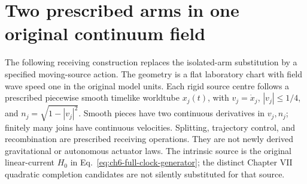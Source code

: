 \section{Two prescribed arms in one original continuum field}
\label{sec:new-shared}
The following receiving construction replaces the isolated-arm substitution
by a specified moving-source action. The geometry is a flat laboratory
chart with field wave speed one in the original model units. Each rigid
source centre follows a prescribed piecewise smooth timelike worldtube
\(x_j(t)\), with \(v_j=\dot x_j\), \(|v_j|\leq1/4\), and
\(n_j=\sqrt{1-|v_j|^2}\). Smooth pieces have two continuous derivatives
in \(v_j,n_j\); finitely many joins have continuous velocities. Splitting,
trajectory control, and recombination are prescribed receiving operations.
They are not newly derived gravitational or autonomous actuator laws.
The intrinsic source is the original linear-current \(H_0\) in
Eq.~\eqref{eq:ch6-full-clock-generator}; the distinct Chapter VII quadratic
completion candidates are not silently substituted for that source.


